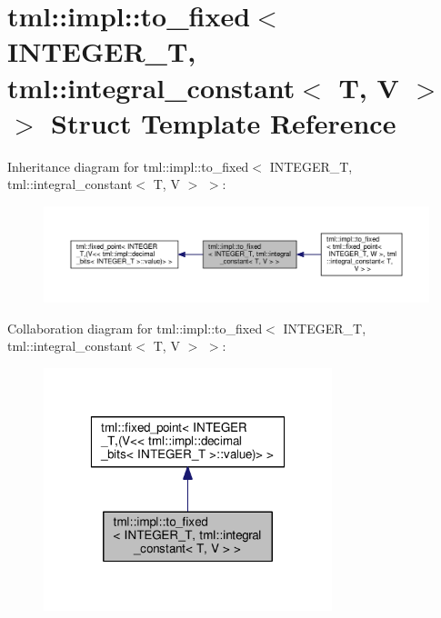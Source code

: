 \hypertarget{structtml_1_1impl_1_1to__fixed_3_01_i_n_t_e_g_e_r___t_00_01tml_1_1integral__constant_3_01_t_00_01_v_01_4_01_4}{\section{tml\+:\+:impl\+:\+:to\+\_\+fixed$<$ I\+N\+T\+E\+G\+E\+R\+\_\+\+T, tml\+:\+:integral\+\_\+constant$<$ T, V $>$ $>$ Struct Template Reference}
\label{structtml_1_1impl_1_1to__fixed_3_01_i_n_t_e_g_e_r___t_00_01tml_1_1integral__constant_3_01_t_00_01_v_01_4_01_4}
}


Inheritance diagram for tml\+:\+:impl\+:\+:to\+\_\+fixed$<$ I\+N\+T\+E\+G\+E\+R\+\_\+\+T, tml\+:\+:integral\+\_\+constant$<$ T, V $>$ $>$\+:
\nopagebreak
\begin{figure}[H]
\begin{center}
\leavevmode
\includegraphics[width=350pt]{structtml_1_1impl_1_1to__fixed_3_01_i_n_t_e_g_e_r___t_00_01tml_1_1integral__constant_3_01_t_00_01_v_01_4_01_4__inherit__graph}
\end{center}
\end{figure}


Collaboration diagram for tml\+:\+:impl\+:\+:to\+\_\+fixed$<$ I\+N\+T\+E\+G\+E\+R\+\_\+\+T, tml\+:\+:integral\+\_\+constant$<$ T, V $>$ $>$\+:
\nopagebreak
\begin{figure}[H]
\begin{center}
\leavevmode
\includegraphics[width=238pt]{structtml_1_1impl_1_1to__fixed_3_01_i_n_t_e_g_e_r___t_00_01tml_1_1integral__constant_3_01_t_00_01_v_01_4_01_4__coll__graph}
\end{center}
\end{figure}
